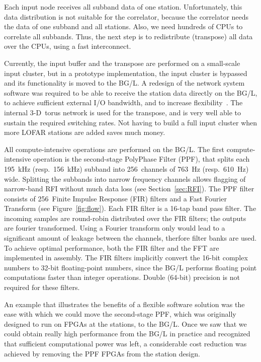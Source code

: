 \documentclass[journal]{IEEEtran}
\begin{document}
Each input node receives all subband data of one station.
Unfortunately, this data distribution is not suitable for the correlator,
because the correlator needs the data of one subband and all stations.
Also, we need hundreds of CPUs to correlate all subbands.
Thus, the next step is to redistribute (transpose) all data over the CPUs,
using a fast interconnect.

Currently, the input buffer and the transpose are performed on a small-scale
input cluster, but in a prototype implementation, the input cluster is
bypassed and its functionality is moved to the BG/L.
A redesign of the network system software was required to be able to
receive the station data directly on the BG/L, to achieve sufficient
external I/O bandwidth, and to increase flexibility~\cite{Iskra:08}.
The internal 3-D~torus network is used for the transpose, and is very well able
to sustain the required switching rates.
Not having to build a full input cluster when more LOFAR stations are added
saves much money.

All compute-intensive operations are performed on the BG/L.
The first compute-intensive operation is the second-stage PolyPhase Filter
(PPF), that splits each 195~kHz (resp.\ 156~kHz) subband into 256~channels of
763~Hz (resp.\ 610~Hz) wide.
Splitting the subbands into narrow frequency channels allows flagging
of narrow-band RFI without much data loss (see Section~\ref{sec:RFI}).
The PPF filter consists of 256~Finite Impulse Response (FIR) filters and a
Fast Fourier Transform (see Figure~\ref{fig:flow}).
Each FIR filter is a 16-tap band pass filter.
The incoming samples are round-robin distributed over the FIR filters;
the outputs are fourier transformed.
Using a Fourier transform only would lead to a significant amount of leakage
between the channels, therfore filter banks are used.
To achieve optimal performance, both the FIR filter and the FFT are implemented
in assembly.
The FIR filters implicitly convert the 16-bit complex numbers to 32-bit
floating-point numbers, since the BG/L performs floating point computations
faster than integer operations.
Double (64-bit) precision is not required for these filters.

An example that illustrates the benefits of a flexible software solution was
the ease with which we could move the second-stage PPF, which was
originally designed to run on FPGAs at the stations, to the BG/L.
Once we saw that we could obtain really high performance from the BG/L
in practice and recognized that sufficient computational power was left,
a considerable cost reduction was achieved by removing the PPF FPGAs from the
station design.
\end{document}
